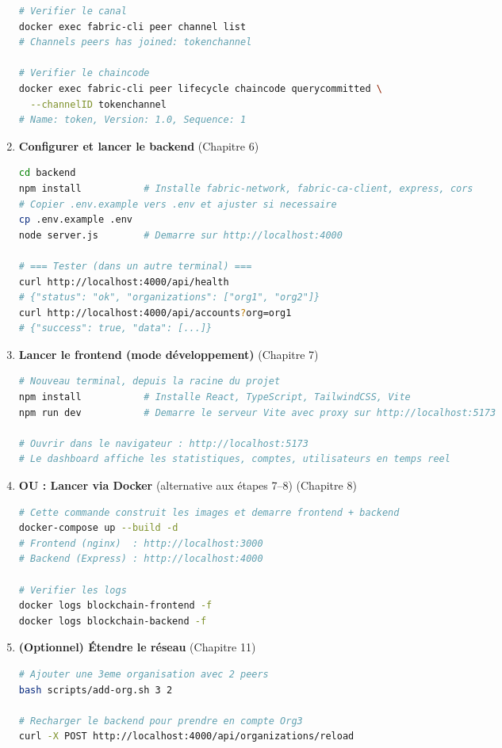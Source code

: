 \documentclass[12pt,a4paper,twoside]{report}
\begin{document}
\begin{enumerate}[leftmargin=2cm, itemsep=10pt]
\begin{lstlisting}[language=bash, numbers=none]
# Verifier le canal
docker exec fabric-cli peer channel list
# Channels peers has joined: tokenchannel

# Verifier le chaincode
docker exec fabric-cli peer lifecycle chaincode querycommitted \
  --channelID tokenchannel
# Name: token, Version: 1.0, Sequence: 1
\end{lstlisting}

\item \textbf{Configurer et lancer le backend} (Chapitre 6)
\begin{lstlisting}[language=bash, numbers=none]
cd backend
npm install           # Installe fabric-network, fabric-ca-client, express, cors
# Copier .env.example vers .env et ajuster si necessaire
cp .env.example .env
node server.js        # Demarre sur http://localhost:4000

# === Tester (dans un autre terminal) ===
curl http://localhost:4000/api/health
# {"status": "ok", "organizations": ["org1", "org2"]}
curl http://localhost:4000/api/accounts?org=org1
# {"success": true, "data": [...]}
\end{lstlisting}

\item \textbf{Lancer le frontend (mode développement)} (Chapitre 7)
\begin{lstlisting}[language=bash, numbers=none]
# Nouveau terminal, depuis la racine du projet
npm install           # Installe React, TypeScript, TailwindCSS, Vite
npm run dev           # Demarre le serveur Vite avec proxy sur http://localhost:5173

# Ouvrir dans le navigateur : http://localhost:5173
# Le dashboard affiche les statistiques, comptes, utilisateurs en temps reel
\end{lstlisting}

\item \textbf{OU : Lancer via Docker} (alternative aux étapes 7--8) (Chapitre 8)
\begin{lstlisting}[language=bash, numbers=none]
# Cette commande construit les images et demarre frontend + backend
docker-compose up --build -d
# Frontend (nginx)  : http://localhost:3000
# Backend (Express) : http://localhost:4000

# Verifier les logs
docker logs blockchain-frontend -f
docker logs blockchain-backend -f
\end{lstlisting}

\item \textbf{(Optionnel) Étendre le réseau} (Chapitre 11)
\begin{lstlisting}[language=bash, numbers=none]
# Ajouter une 3eme organisation avec 2 peers
bash scripts/add-org.sh 3 2

# Recharger le backend pour prendre en compte Org3
curl -X POST http://localhost:4000/api/organizations/reload
\end{lstlisting}

\end{enumerate}
\end{document}

